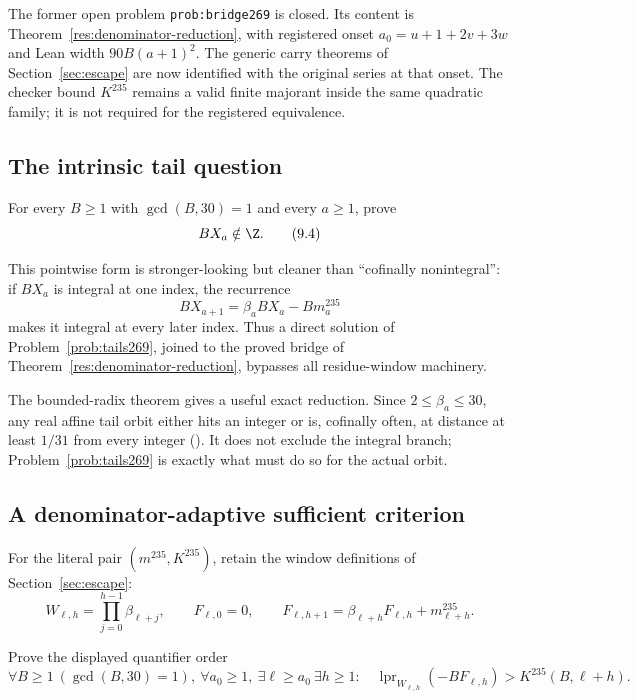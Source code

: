 The former open problem \texttt{prob:bridge269} is closed.  Its content is
Theorem~\ref{res:denominator-reduction}, with registered onset
$a_0=u+1+2v+3w$ and Lean width $90B(a+1)^2$.  The generic carry theorems of
Section~\ref{sec:escape} are now identified with the original series at that
onset.  The checker bound $K^{235}$ remains a valid finite majorant inside
the same quadratic family; it is not required for the registered equivalence.

\subsection{The intrinsic tail question}

\begin{problem}\label{prob:tails269}
For every $B\ge1$ with $\gcd(B,30)=1$ and every $a\ge1$, prove
\[
 B X_a\notin\Z.
\tag{9.4}\label{eq:tail-nonintegrality}
\]
\end{problem}

This pointwise form is stronger-looking but cleaner than “cofinally
nonintegral”: if $B X_a$ is integral at one index, the recurrence
\[
 B X_{a+1}=\beta_a B X_a-Bm_a^{235}
\]
makes it integral at every later index.  Thus a direct solution of
Problem~\ref{prob:tails269}, joined to the proved bridge of
Theorem~\ref{res:denominator-reduction}, bypasses all residue-window
machinery.

The bounded-radix theorem gives a useful exact reduction.  Since
$2\le\beta_a\le30$, any real affine tail orbit either hits an integer or is,
cofinally often, at distance at least $1/31$ from every integer
().
It does not exclude the integral branch; Problem~\ref{prob:tails269} is exactly
what must do so for the actual orbit.

\subsection{A denominator-adaptive sufficient criterion}

For the literal pair $(m^{235},K^{235})$, retain the window definitions of
Section~\ref{sec:escape}:
\[
 W_{\ell,h}=\prod_{j=0}^{h-1}\beta_{\ell+j},\qquad
 F_{\ell,0}=0,\qquad
 F_{\ell,h+1}=\beta_{\ell+h}F_{\ell,h}+m_{\ell+h}^{235}.
\]

\begin{problem}\label{prob:producer}
Prove the displayed quantifier order
\[
 \forall B\ge1\ (\gcd(B,30)=1),\ \forall a_0\ge1,\
 \exists\ell\ge a_0\ \exists h\ge1:\quad
 \operatorname{lpr}_{W_{\ell,h}}(-BF_{\ell,h})
   >K^{235}(B,\ell+h).
\tag{9.5}\label{eq:actual-escape}
\]
\end{problem}

